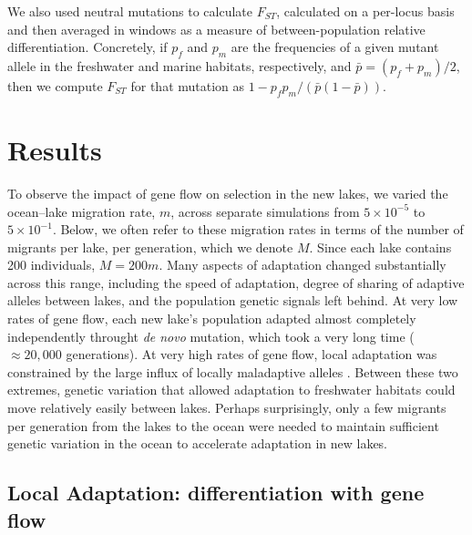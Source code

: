\documentclass{article}
\begin{document}
We also used neutral mutations to calculate $F_{ST}$,
calculated on a per-locus basis and then averaged in windows 
as a measure of between-population relative differentiation.
Concretely, if $p_f$ and $p_m$ are the frequencies of a given mutant allele
in the freshwater and marine habitats, respectively,
and $\bar p = (p_f + p_m)/2$,
then we compute $F_{ST}$ for that mutation as $1 - p_f p_m / (\bar p (1-\bar p))$.

\section*{Results}

To observe the impact of gene flow on selection in the new lakes, 
we varied the ocean--lake migration rate, $m$, across separate simulations from $5 \times 10^{-5}$ to $5 \times 10^{-1}$.
Below, we often refer to these migration rates in terms of the number of migrants per lake, per generation, which we denote $M$.
Since each lake contains 200 individuals, $M=200m$.
Many aspects of adaptation changed substantially across this range, including the speed of adaptation, 
degree of sharing of adaptive alleles between lakes, and the population genetic signals left behind.
At very low rates of gene flow, each new lake's population adapted almost completely independently throught \emph{de novo} mutation, 
which took a very long time ($\approx 20,000$ generations).
At very high rates of gene flow, local adaptation was constrained by the large influx of locally maladaptive alleles \citet{bolnick2007natural}.
Between these two extremes, genetic variation that allowed adaptation to freshwater habitats could move relatively easily between lakes.
Perhaps surprisingly, only a few migrants per generation from the lakes to the ocean were needed
to maintain sufficient genetic variation in the ocean to accelerate adaptation in new lakes.

\subsection*{Local Adaptation: differentiation with gene flow}
\end{document}
